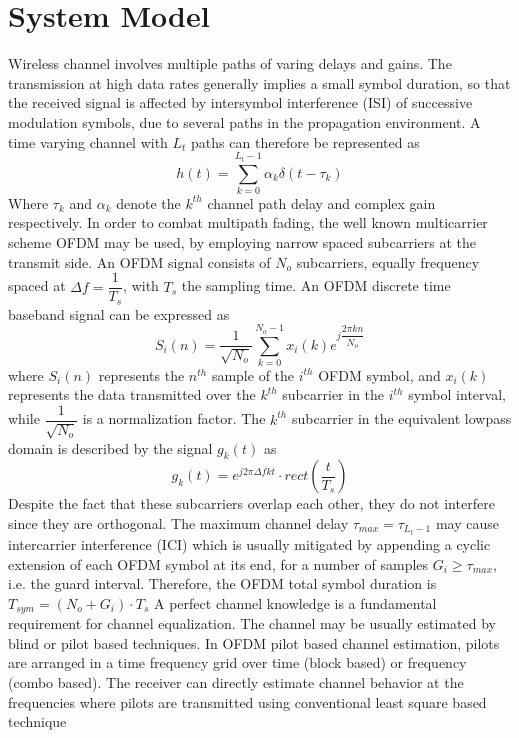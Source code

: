 \section{System Model}
\label{SM}
 Wireless channel involves multiple paths of varing delays and gains. The transmission at high data rates generally implies a small symbol duration, so that the received signal  is affected by intersymbol interference (ISI) of successive modulation symbols, due to several paths in the propagation environment. A time varying channel with $L_t$ paths can therefore be represented as 
 \begin{equation}
h(t)=\sum_{k=0}^{L_t-1}\alpha_k\delta(t-\tau_k)
 \end{equation}
 Where $\tau_k$ and $\alpha_k$ denote the $k^{th}$ channel path delay and complex gain respectively. In order to combat multipath fading, the well known multicarrier scheme OFDM may be used, by employing narrow spaced subcarriers at the transmit side. An OFDM signal consists of $N_o$ subcarriers, equally frequency spaced at ${\Delta} f=\dfrac{1}{T_s}$, with $T_s$ the sampling time.
  An OFDM discrete time baseband signal can be expressed as 
  \begin{equation}
S_i(n)=\dfrac{1}{\sqrt{N_o}}\sum_{k=0}^{N_o-1}x_i(k)e^{j\dfrac{2\pi kn}{N_o}}
  \end{equation}
  where $S_i(n)$ represents the $n^{th}$ sample of the $i^{th}$ OFDM symbol, and $x_i(k)$ represents the data transmitted over the $k^{th}$ subcarrier in the $i^{th}$ symbol interval, while $\dfrac{1}{\sqrt{N_o}}$ is a normalization factor.
The $k^{th}$ subcarrier in the equivalent lowpass domain is described by the signal $g_k(t)$ as
\begin{equation}
g_k(t)= e^{j2\pi{\Delta}fkt}\cdot rect(\dfrac{t}{T_s})
\end{equation}
Despite the fact that these subcarriers overlap each other, they do not interfere since they are orthogonal. 
The maximum channel delay $\tau_{max}=\tau_{L_t-1}$ may cause intercarrier interference (ICI) which is usually mitigated by appending a cyclic extension of each OFDM symbol at its end, for a number of samples $G_i\ge \tau_{max}$, i.e. the guard interval.
Therefore, the OFDM total symbol duration is $T_{sym}=(N_o+G_i)\cdot T_s$
A perfect channel knowledge is a fundamental requirement for channel equalization. 
The channel may be usually estimated by blind or pilot based techniques. In OFDM pilot based channel estimation, pilots are arranged in a time frequency grid over time (block based) or frequency (combo based). The receiver can directly estimate channel behavior at the frequencies where pilots are transmitted using conventional least square based technique
